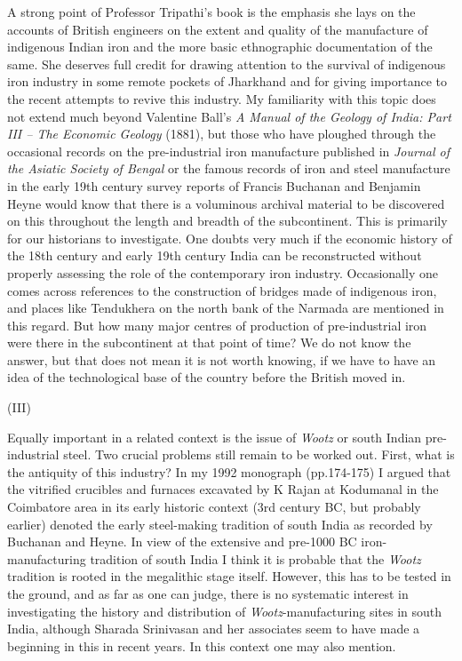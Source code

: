 A strong point of Professor Tripathi's book is the emphasis she lays on the accounts of British engineers on the extent and quality of the manufacture of indigenous Indian iron and the more basic ethnographic documentation of the same. She deserves full credit for drawing attention to the survival of indigenous iron industry in some remote pockets of Jharkhand and for giving importance to the recent attempts to revive this industry. My familiarity with this topic does not extend much beyond Valentine Ball's \textit{A Manual of the Geology of India: Part III – The Economic Geology }(1881), but those who have ploughed through the occasional records on the pre-industrial iron manufacture published in \textit{Journal of the Asiatic Society of Bengal }or the famous records of iron and steel manufacture in the early 19th century survey reports of Francis Buchanan and Benjamin Heyne would know that there is a voluminous archival material to be discovered on this throughout the length and breadth of the subcontinent. This is primarily for our historians to investigate. One doubts very much if the economic history of the 18th century and early 19th century India can be reconstructed without properly assessing the role of the contemporary iron industry. Occasionally one comes across references to the construction of bridges made of indigenous iron, and places like Tendukhera on the north bank of the Narmada are mentioned in this regard. But how many major centres of production of pre-industrial iron were there in the subcontinent at that point of time? We do not know the answer, but that does not mean it is not worth knowing, if we have to have an idea of the technological base of the country before the British moved in.

\begin{center}
(III)
\end{center}

Equally important in a related context is the issue of \textit{Wootz} or south Indian pre-industrial steel. Two crucial problems still remain to be worked out. First, what is the antiquity of this industry? In my 1992 monograph (pp.174-175) I argued that the vitrified crucibles and furnaces excavated by K Rajan at Kodumanal in the Coimbatore area in its early historic context (3rd century BC, but probably earlier) denoted the early steel-making tradition of south India as recorded by Buchanan and Heyne. In view of the extensive and pre-1000 BC iron-manufacturing tradition of south India I think it is probable that the \textit{Wootz} tradition is rooted in the megalithic stage itself. However, this has to be tested in the ground, and as far as one can judge, there is no systematic interest in investigating the history and distribution of \textit{Wootz}-manufacturing sites in south India, although Sharada Srinivasan and her associates seem to have made a beginning in this in recent years. In this context one may also mention.

